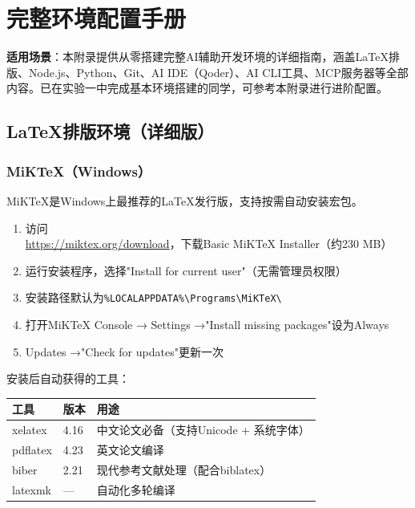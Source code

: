 

\chapter{完整环境配置手册}

\textbf{适用场景}：本附录提供从零搭建完整AI辅助开发环境的详细指南，涵盖LaTeX排版、Node.js、Python、Git、AI IDE（Qoder）、AI CLI工具、MCP服务器等全部内容。已在实验一中完成基本环境搭建的同学，可参考本附录进行进阶配置。

\section{LaTeX排版环境（详细版）}

\subsection{MiKTeX（Windows）}

MiKTeX是Windows上最推荐的LaTeX发行版，支持按需自动安装宏包。

\begin{enumerate}[leftmargin=2em]
  \item 访问\url{https://miktex.org/download}，下载Basic MiKTeX Installer（约230 MB）
  \item 运行安装程序，选择"Install for current user"（无需管理员权限）
  \item 安装路径默认为\texttt{\%LOCALAPPDATA\%\textbackslash Programs\textbackslash MiKTeX\textbackslash}
  \item 打开MiKTeX Console → Settings →"Install missing packages"设为Always
  \item Updates →"Check for updates"更新一次
\end{enumerate}

安装后自动获得的工具：

\begin{table}[H]
\centering
\begin{tabular}{llp{7cm}}
\toprule
\textbf{工具} & \textbf{版本} & \textbf{用途} \\
\midrule
xelatex & 4.16 & 中文论文必备（支持Unicode + 系统字体） \\
pdflatex & 4.23 & 英文论文编译 \\
biber & 2.21 & 现代参考文献处理（配合biblatex） \\
latexmk & --- & 自动化多轮编译 \\
\bottomrule
\end{tabular}
\end{table}

